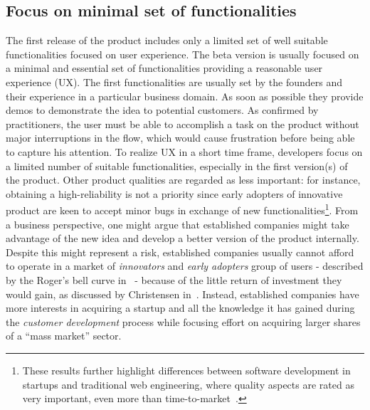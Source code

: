 \documentclass[10pt,journal,letterpaper,compsoc]{IEEEtran}
\begin{document}
\subsection{Focus on minimal set of functionalities} 
The first release of the product includes only a limited set of well suitable 
functionalities focused on user experience. The beta version is usually 
focused on a minimal and essential set of functionalities providing a reasonable 
user experience (UX). The first functionalities are usually set by the 
founders and their experience in a particular business domain. As soon as 
possible they provide demos to demonstrate the idea to potential customers. 
As confirmed by practitioners, the user must be able to accomplish a task on 
the product without major interruptions in the flow, which would cause 
frustration before being able to capture his attention. To realize UX in a 
short time frame, developers focus on a limited number of suitable 
functionalities, especially in the first version(s) of the product. Other 
product qualities are regarded as less important: for instance, obtaining a 
high-reliability is not a priority since early adopters of innovative product 
are keen to accept minor bugs in exchange of new functionalities\footnote{These 
results further highlight differences between software development in startups 
and traditional web engineering, where quality aspects are rated as very 
important, even more than time-to-market~\cite{Offutt2002}.}. From a business 
perspective, one might argue that established companies might take advantage of 
the new idea and develop a better version of the product internally. Despite 
this might represent a risk, established companies usually cannot afford to 
operate in a market of \textit{innovators} and \textit{early adopters} group 
of users - described by the Roger's bell curve in~\cite{Rogers} - because of 
the little return of investment they would gain, as discussed by Christensen 
in~\cite{Christensen2003}. Instead, established companies have more interests 
in acquiring a startup and all the knowledge it has gained during the 
\textit{customer development} process while focusing effort on acquiring larger
shares of a ``mass market'' sector. 
\end{document}
